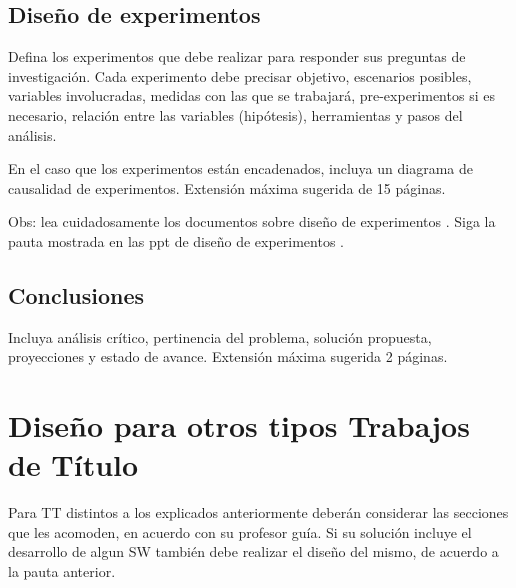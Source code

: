 \subsection{Diseño de experimentos} \label{disenoexp}
Defina los  experimentos que debe realizar para responder sus preguntas de investigación.
Cada experimento  debe precisar objetivo, escenarios posibles,
variables involucradas, medidas con las que se trabajará, pre-experimentos si es
necesario, relación entre las variables (hipótesis), herramientas y pasos del análisis.

 En el caso que los experimentos están encadenados, incluya un diagrama de causalidad de
experimentos.  Extensión máxima sugerida de 15 páginas.

Obs: lea cuidadosamente los documentos sobre diseño de experimentos \cite{inv,dawson,fundibeq,extracto_dawson}. Siga la pauta mostrada en las ppt de diseño de experimentos \cite{extracto_dawson_ppt}.

\subsection{Conclusiones} \label{conclusiones}
Incluya análisis crítico, pertinencia del problema, solución propuesta, proyecciones
y estado de avance. Extensión máxima sugerida  2 páginas.


\section{Diseño para otros tipos  Trabajos de Título }

 Para TT distintos a los explicados anteriormente deberán considerar las secciones que  les acomoden, en  acuerdo con su profesor guía.
  Si su solución incluye el desarrollo de algun SW también debe realizar el diseño del mismo, de acuerdo a la pauta anterior.